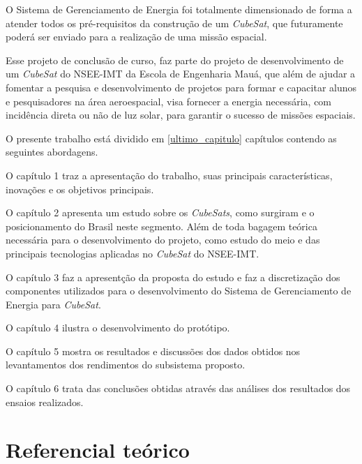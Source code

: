 \documentclass[
	12pt,				%
	openright,			%
	oneside,			%
	a4paper,			%
	english,			%
	french,				%
	spanish,			%
	brazil,				%
	oldfontcommands
	]{abntex2}
\begin{document}
	O Sistema de Gerenciamento de Energia foi totalmente dimensionado de forma a atender todos os pré-requisitos da construção de um \textit{CubeSat}, que futuramente poderá ser enviado para a realização de uma missão espacial.


	Esse projeto de conclusão de curso, faz parte do projeto de desenvolvimento de um \textit{CubeSat} do NSEE-IMT da Escola de Engenharia Mauá, que além de ajudar a fomentar a pesquisa e desenvolvimento de projetos para formar e capacitar alunos e pesquisadores na área aeroespacial, visa fornecer a energia necessária, com incidência direta ou não de luz solar, para garantir o sucesso de missões espaciais.
	
	O presente trabalho está dividido em \ref{ultimo_capitulo} capítulos contendo as seguintes abordagens.

	O capítulo 1 traz a apresentação do trabalho, suas principais características, inovações e os objetivos principais.

	O capítulo 2 apresenta um estudo sobre os \textit{CubeSats}, como surgiram e o posicionamento do Brasil neste segmento. Além de toda bagagem teórica necessária para o desenvolvimento do projeto, como estudo do meio e das principais tecnologias aplicadas no \textit{CubeSat} do NSEE-IMT.

	O capítulo 3 faz a apresentção da proposta do estudo e faz a discretização dos componentes utilizados para o desenvolvimento do Sistema de Gerenciamento de Energia para \textit{CubeSat}.

	O capítulo 4 ilustra o desenvolvimento do protótipo.	
	
	O capítulo 5 mostra os resultados e discussões dos dados obtidos nos levantamentos dos rendimentos do subsistema proposto.

	O capítulo 6 trata das conclusões obtidas através das análises dos resultados dos ensaios realizados. 

\chapter[Referencial teórico]{Referencial teórico} \label{Cap_Teorico}
\end{document}

